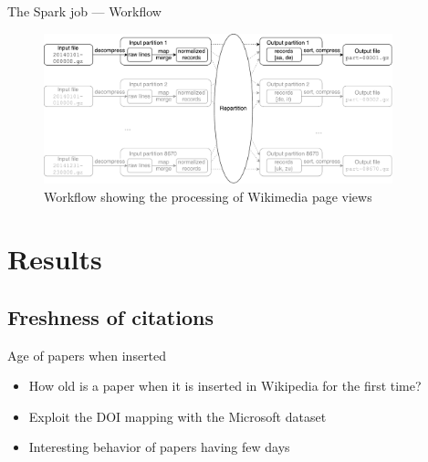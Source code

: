 \documentclass{beamer}
\begin{document}
\begin{frame}[c]{The Spark job --- Workflow}
    \begin{figure}
    \centering
    \includegraphics[width=0.9\textwidth]{assets/spark-pagecounts}
    \caption{Workflow showing the processing of Wikimedia page views}
    \end{figure}
\end{frame}


\section{Results}



\subsection{Freshness of citations}
\begin{frame}{Age of papers when inserted}
    \begin{itemize}
        \item How old is a paper when it is inserted in Wikipedia for the first time?
        \item Exploit the DOI mapping with the Microsoft dataset
        \item Interesting behavior of papers having few days
    \end{itemize}
\end{frame}
\end{document}
